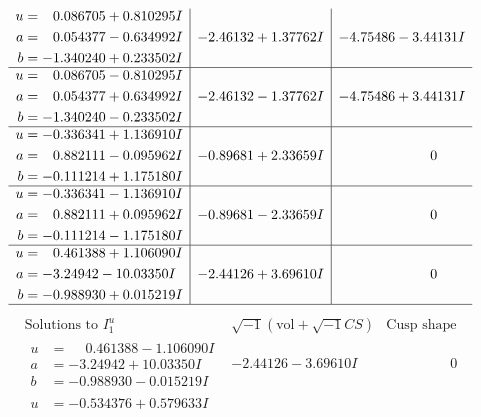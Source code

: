 \documentclass[1p]{elsarticle_modified}
\theoremstyle{definition}
\newcommand{\I}{\sqrt{-1}}
\begin{document}
$$\begin{array}{c|c|c}
\begin{aligned}
u &= \phantom{-}0.086705 + 0.810295 I \\
a &= \phantom{-}0.054377 - 0.634992 I \\
b &= -1.340240 + 0.233502 I\end{aligned}
 & -2.46132 + 1.37762 I & -4.75486 - 3.44131 I \\ \hline\begin{aligned}
u &= \phantom{-}0.086705 - 0.810295 I \\
a &= \phantom{-}0.054377 + 0.634992 I \\
b &= -1.340240 - 0.233502 I\end{aligned}
 & -2.46132 - 1.37762 I & -4.75486 + 3.44131 I \\ \hline\begin{aligned}
u &= -0.336341 + 1.136910 I \\
a &= \phantom{-}0.882111 - 0.095962 I \\
b &= -0.111214 + 1.175180 I\end{aligned}
 & -0.89681 + 2.33659 I & \phantom{-0.000000 } 0 \\ \hline\begin{aligned}
u &= -0.336341 - 1.136910 I \\
a &= \phantom{-}0.882111 + 0.095962 I \\
b &= -0.111214 - 1.175180 I\end{aligned}
 & -0.89681 - 2.33659 I & \phantom{-0.000000 } 0 \\ \hline\begin{aligned}
u &= \phantom{-}0.461388 + 1.106090 I \\
a &= -3.24942 - 10.03350 I \\
b &= -0.988930 + 0.015219 I\end{aligned}
 & -2.44126 + 3.69610 I & \phantom{-0.000000 } 0\\
 \hline 
 \end{array}$$\newpage$$\begin{array}{c|c|c}  
\text{Solutions to }I^u_{1}& \I (\text{vol} + \sqrt{-1}CS) & \text{Cusp shape}\\
 \hline 
\begin{aligned}
u &= \phantom{-}0.461388 - 1.106090 I \\
a &= -3.24942 + 10.03350 I \\
b &= -0.988930 - 0.015219 I\end{aligned}
 & -2.44126 - 3.69610 I & \phantom{-0.000000 } 0 \\ \hline\begin{aligned}
u &= -0.534376 + 0.579633 I \\

\end{aligned}
\end{array}$$
\end{document}
